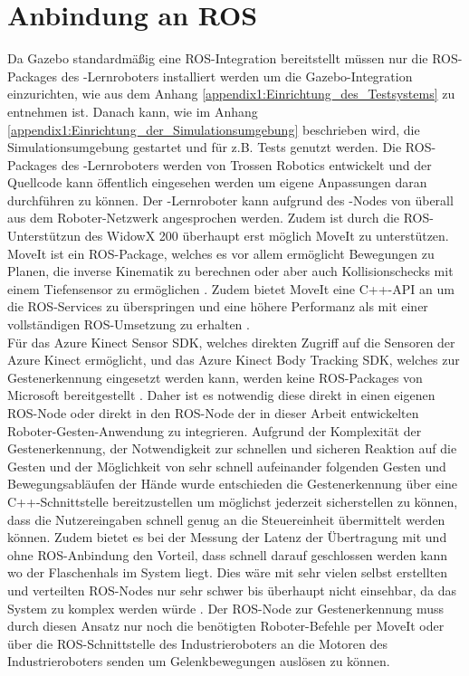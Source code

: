 
\section{Anbindung an ROS}
Da Gazebo standardmäßig eine ROS-Integration bereitstellt müssen nur die ROS-Packages des -Lernroboters installiert werden um die Gazebo-Integration einzurichten, wie aus dem Anhang \ref{appendix1:Einrichtung_des_Testsystems} zu entnehmen ist. Danach kann, wie im Anhang \ref{appendix1:Einrichtung_der_Simulationsumgebung} beschrieben wird, die Simulationsumgebung gestartet und für z.B. Tests genutzt werden. Die ROS-Packages des -Lernroboters werden von Trossen Robotics entwickelt und der Quellcode kann öffentlich eingesehen werden um eigene Anpassungen daran durchführen zu können. Der -Lernroboter kann aufgrund des -Nodes von überall aus dem Roboter-Netzwerk angesprochen werden. Zudem ist durch die ROS-Unterstützun des WidowX 200 überhaupt erst möglich MoveIt zu unterstützen. MoveIt ist ein ROS-Package, welches es vor allem ermöglicht Bewegungen zu Planen, die inverse Kinematik zu berechnen oder aber auch Kollisionschecks mit einem Tiefensensor zu ermöglichen \cite{moveit_nodate}. Zudem bietet MoveIt eine C++-API an um die ROS-Services zu überspringen und eine höhere Performanz als mit einer vollständigen ROS-Umsetzung zu erhalten \cite{moveit_tutorial_nodate}.\\

Für das Azure Kinect Sensor SDK, welches direkten Zugriff auf die Sensoren der Azure Kinect ermöglicht, und das Azure Kinect Body Tracking SDK, welches zur Gestenerkennung eingesetzt werden kann, werden keine ROS-Packages von Microsoft bereitgestellt \cite{tesych_about_azure_kinect_sdks_nodate}. Daher ist es notwendig diese direkt in einen eigenen ROS-Node oder direkt in den ROS-Node der in dieser Arbeit entwickelten Roboter-Gesten-Anwendung zu integrieren. Aufgrund der Komplexität der Gestenerkennung, der Notwendigkeit zur schnellen und sicheren Reaktion auf die Gesten und der Möglichkeit von sehr schnell aufeinander folgenden Gesten und Bewegungsabläufen der Hände wurde entschieden die Gestenerkennung über eine C++-Schnittstelle bereitzustellen um möglichst jederzeit sicherstellen zu können, dass die Nutzereingaben schnell genug an die Steuereinheit übermittelt werden können. Zudem bietet es bei der Messung der Latenz der Übertragung mit und ohne ROS-Anbindung den Vorteil, dass schnell darauf geschlossen werden kann wo der Flaschenhals im System liegt. Dies wäre mit sehr vielen selbst erstellten und verteilten ROS-Nodes nur sehr schwer bis überhaupt nicht einsehbar, da das System zu komplex werden würde \cite{why_dont_we_use_ros_nodate}. Der ROS-Node zur Gestenerkennung muss durch diesen Ansatz nur noch die benötigten Roboter-Befehle per MoveIt oder über die ROS-Schnittstelle des Industrieroboters an die Motoren des Industrieroboters senden um Gelenkbewegungen auslösen zu können.

